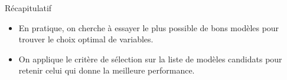 \documentclass[
  ignorenonframetext,
]{beamer}
\providecommand{\tightlist}{%
  \setlength{\itemsep}{0pt}\setlength{\parskip}{0pt}}\usepackage{longtable,booktabs,array}
\begin{document}
\begin{frame}{Récapitulatif}
\label{ruxe9capitulatif-4}
\begin{itemize}
\tightlist
\item
  En pratique, on cherche à essayer le plus possible de bons modèles
  pour trouver le choix optimal de variables.
\item
  On applique le critère de sélection sur la liste de modèles candidats
  pour retenir celui qui donne la meilleure performance.
\end{itemize}
\end{frame}
\end{document}
